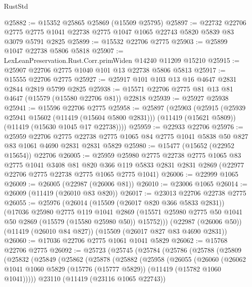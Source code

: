 \begin{lexlean}{RustStd}
\begin{coremodule}
@25882 := @15352 @25865 @25869 (@15509 @25795)
@25897 := @22732
    @22706
    @2775
    @2775
    @1041
    @22738
    @2775
    @1047
    @1065
    @22743
    @5820
    @5839
    @83
    @3079
    @5791
    @2825
@25899 := @15532 @22706 @2775
@25903 := @25899 @1047 @22738 @5806 @5818
@25907 := LexLeanPreservation.Rust.Corr.primWiden @14240 @11209 @15210
@25915 := @25907 @22706 @2775 @1040 @101 @13 @22738 @5806 @5813
@25917 := @15555 @22706 @2775
@25927 := @25917 @101 @103 @13 @16 @4647 @2831 @2844 @2819 @5799 @2825
@25938 := @15571 @22706 @2775 @81 @13 @81 @4647 (@15579 (@15580 @22706 @81)) @22818
@25939 := @25927 @25938
@25941 := @15596 @22706 @2775
@25958 := @25897
    (@25903
      (@25915
        (@25939 @25941 @15602 (@11419 (@15604 @5800 @2831)))
        (@11419 (@15621 @5809))
        (@11419 (@15630 @1045 @17 @22738))))
@25959 := @22933 @22706
@25976 := @25959
    @22706
    @2775
    @22738
    @2775
    @1065
    @84
    @2775
    @1041
    @5838
    @50
    @827
    @83
    @1061
    @4690
    @2831
    @2831
    @5829
@25980 := @15477 (@15652 (@22952 @15654)) @22706
@26005 := @25959
    @25980
    @2775
    @22738
    @2775
    @1065
    @83
    @2775
    @1041
    @3408
    @81
    @820
    @366
    @119
    @5833
    @2831
    @2831
    @2869
    (@22977 @22706 @2775 @22738 @2775 @1065 @2775 @1041)
@26006 := @22999 @1065
@26009 := @26005 (@22987 (@26006 @81))
@26010 := @23006 @1065
@26014 := @26009 (@11419 (@26010 @83 @820))
@26017 := @23013 @22706 @22738 @2775
@26055 := @25976
    (@26014
      (@15509 (@26017 @820 @366 @5833 @2831))
      (@17036
        @25980
        @2775
        @119
        @1041
        @2869
        (@15571 @25980 @2775 @50 @1041 @50 @2869 (@15579 (@15580 @25980 @50)) @15752)))
    (@22987 (@26006 @50))
    (@11419 (@26010 @84 @827))
    (@15509 (@26017 @827 @83 @4690 @2831))
@26060 := @17036 @22706 @2775 @1061 @1041 @5829
@26062 := @15768 @22706 @2775
@26092 := @25723
    (@25745
      (@25784
        (@25786
          (@25788
            (@25809
              (@25832
                (@25849
                  (@25862
                    (@25878
                      (@25882
                        (@25958
                          (@26055
                            (@26060
                              (@26062
                                @1041
                                @1060
                                @5829
                                (@15776 (@15777 @5829))
                                (@11419 (@15782 @1060 @1041)))))
                          @23110
                          (@11419 (@23116 @1065 @22743))

\end{coremodule}
\end{lexlean}
